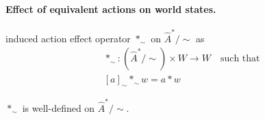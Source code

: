 \paragraph{Effect of equivalent actions on world states.}
 induced action effect operator $\ast_{\sim}$ on $\hat{A}^{\ast}/\sim$ as
\begin{equation}
\begin{aligned}
    & \ast_{\sim}: (\hat{A}^{\ast}/\sim) \times W \to W \quad \text{such that} \\
    & [a]_{\sim} \ast_{\sim} w = a \ast w
\end{aligned}
\end{equation}

\begin{propositionE}
    $\ast_{\sim}$ is well-defined on $\hat{A}^{\ast}/\sim$.
\end{propositionE}
